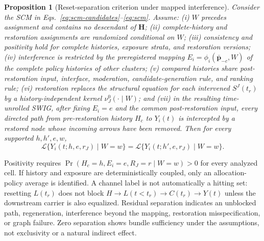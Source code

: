 \documentclass[10pt,a4paper]{article}
\newtheorem{proposition}{Proposition}
\begin{document}
\begin{proposition}[Reset-separation criterion under mapped interference]
\label{prop:reset-separation}
Consider the SCM in Eqs.~\eqref{eq:scm-candidates}--\eqref{eq:scm}. Assume: (i) $W$ precedes assignment and contains no descendant of $\bm H$; (ii) complete-history and restoration assignments are randomized conditional on $W$; (iii) consistency and positivity hold for complete histories, exposure strata, and restoration versions; (iv) interference is restricted by the preregistered mapping $E_i=\phi_i(\bm{\bar p}_{-c},W)$ of the complete policy histories of other clusters; (v) compared histories share post-restoration input, interface, moderation, candidate-generation rule, and ranking rule; (vi) restoration replaces the structural equation for each intervened $S^J(t_r)$ by a history-independent kernel $\nu_J^0(\cdot\mid W)$; and (vii) in the resulting time-unrolled SWIG, after fixing $E_i=e$ and the common post-restoration input, every directed path from pre-restoration history $H_c$ to $Y_i(t)$ is intercepted by a restored node whose incoming arrows have been removed. Then for every supported $h,h',e,w$,
\begin{equation}
\mathcal L\{Y_i(t;h,e,r_J)\mid W=w\}
=\mathcal L\{Y_i(t;h',e,r_J)\mid W=w\}.
\label{eq:reset-separation}
\end{equation}
\end{proposition}

Positivity requires $\Pr(H_c=h,E_i=e,R_J=r\mid W=w)>0$ for every analyzed cell. If history and exposure are deterministically coupled, only an allocation-policy average is identified. A channel label is not automatically a hitting set: resetting $L(t_r)$ does not block $H\rightarrow L(t<t_r)\rightarrow C(t_r)\rightarrow Y(t)$ unless the downstream carrier is also equalized. Residual separation indicates an unblocked path, regeneration, interference beyond the mapping, restoration misspecification, or graph failure. Zero separation shows bundle sufficiency under the assumptions, not exclusivity or a natural indirect effect.
\end{document}
